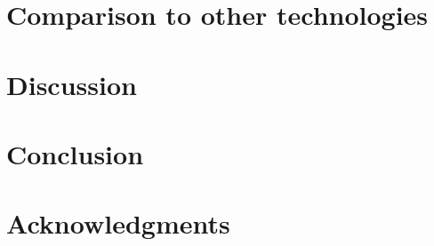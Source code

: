\documentclass[preprint,12pt]{elsarticle} %
\begin{document}
\section{Comparison to other technologies}
\label{ch:comparison}


\section{Discussion}
\label{ch:discussion}


\section{Conclusion}
\label{ch:conclusion}


\section{Acknowledgments}
\label{ch:acknowledgments}



   
  
\end{document}

